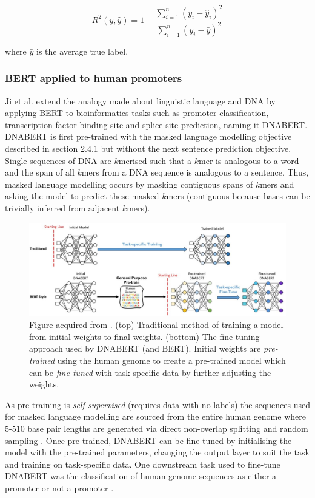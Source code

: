 \documentclass{article}
\begin{document}
$$R^2(y, \hat{y}) = 1 - \frac{\sum_{i=1}^{n} (y_i - \hat{y}_i)^2}{\sum_{i=1}^{n} (y_i - \bar{y})^2}
$$

where $\bar{y}$ is the average true label.

\subsubsection{BERT applied to human promoters}
Ji et al. \cite{dnabert2020} extend the analogy made about linguistic language and DNA by applying BERT to bioinformatics tasks such as promoter classification, transcription factor binding site and splice site prediction, naming it DNABERT. DNABERT is first pre-trained with the masked language modelling objective described in section 2.4.1 but without the next sentence prediction objective. Single sequences of DNA are $k$merised such that a $k$mer is analogous to a word and the span of all $k$mers from a DNA sequence is analogous to a sentence. Thus, masked language modelling occurs by masking contiguous spans of $k$mers and asking the model to predict these masked $k$mers (contiguous because bases can be trivially inferred from adjacent $k$mers).

\begin{figure}[H]
    \centering
    \includegraphics[width=1\linewidth]{images/pretrain.jpg}
    \caption{Figure acquired from \cite{dnabert2020}. (top) Traditional method of training a model from initial weights to final weights. (bottom) The fine-tuning approach used by DNABERT (and BERT). Initial weights are \textit{pre-trained} using the human genome to create a pre-trained model which can be \textit{fine-tuned} with task-specific data by further adjusting the weights.}
    \label{fig:pretrain}
\end{figure}

As pre-training is \textit{self-supervised} (requires data with no labels) the sequences used for masked language modelling are sourced from the entire human genome where $5$-$510$ base pair lengths are generated via direct non-overlap splitting and random sampling \cite{dnabert2020}. Once pre-trained, DNABERT can be fine-tuned by initialising the model with the pre-trained parameters, changing the output layer to suit the task and training on task-specific data. One downstream task used to fine-tune DNABERT was the classification of human genome sequences as either a promoter or not a promoter \cite{dnabert2020}. 
\end{document}
